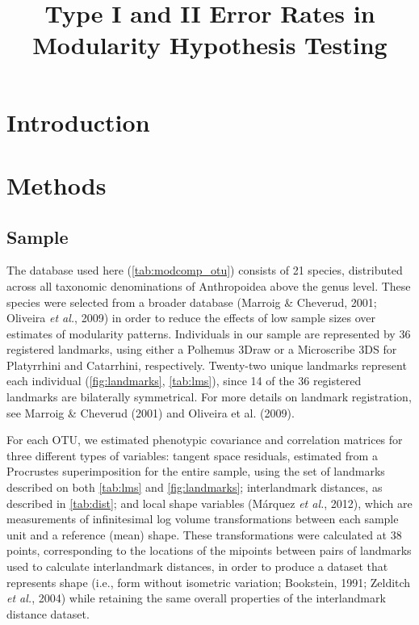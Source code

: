 \documentclass[11pt,]{article}
\title{Type I and II Error Rates in Modularity Hypothesis Testing}
\author{}
\date{}
\begin{document}
\maketitle


\linenumbers
\modulolinenumbers[2]

\onehalfspacing

\section{Introduction}\label{introduction}

\section{Methods}\label{methods}

\subsection{Sample}\label{sample}

The database used here (\autoref{tab:modcomp_otu}) consists of 21
species, distributed across all taxonomic denominations of Anthropoidea
above the genus level. These species were selected from a broader
database (Marroig \& Cheverud, 2001; Oliveira \emph{et al.}, 2009) in
order to reduce the effects of low sample sizes over estimates of
modularity patterns. Individuals in our sample are represented by 36
registered landmarks, using either a Polhemus 3Draw or a Microscribe 3DS
for Platyrrhini and Catarrhini, respectively. Twenty-two unique
landmarks represent each individual (\autoref{fig:landmarks},
\autoref{tab:lms}), since 14 of the 36 registered landmarks are
bilaterally symmetrical. For more details on landmark registration, see
Marroig \& Cheverud (2001) and Oliveira et al. (2009).



For each OTU, we estimated phenotypic covariance and correlation
matrices for three different types of variables: tangent space
residuals, estimated from a Procrustes superimposition for the entire
sample, using the set of landmarks described on both \autoref{tab:lms}
and \autoref{fig:landmarks}; interlandmark distances, as described in
\autoref{tab:dist}; and local shape variables (Márquez \emph{et al.},
2012), which are measurements of infinitesimal log volume
transformations between each sample unit and a reference (mean) shape.
These transformations were calculated at 38 points, corresponding to the
locations of the mipoints between pairs of landmarks used to calculate
interlandmark distances, in order to produce a dataset that represents
shape (i.e., form without isometric variation; Bookstein, 1991; Zelditch
\emph{et al.}, 2004) while retaining the same overall properties of the
interlandmark distance dataset.
\end{document}
